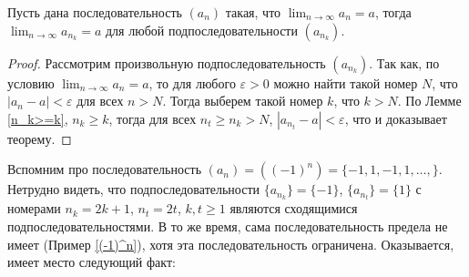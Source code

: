 \begin{theorem}\label{lim(sub)=lim}
    Пусть дана последовательность $(a_n)$ такая, что $\lim_{n\to \infty}a_n = a$, тогда $\lim_{n\to \infty}a_{n_k} =a$ для любой подпоследовательности $(a_{n_k} )$.
\end{theorem}
\begin{proof}
    Рассмотрим произвольную подпоследовательность $(a_{n_k} )$. Так как, по условию $\lim_{n \to \infty}a_n =a$, то для любого $\varepsilon >0$ можно найти такой номер $N$, что $|a_n - a| < \varepsilon$ для всех $n >N$. Тогда выберем такой номер $k$, что $k >N$. По Лемме \ref{n_k>=k}, $n_k \ge k$, тогда для всех $n_t \ge n_k >N$, $|a_{n_t}- a| < \varepsilon$, что и доказывает теорему.
\end{proof}

\begin{example}
 Вспомним про последовательность $(a_n) = ((-1)^n ) = \{-1,1,-1,1, \ldots, \}$. Нетрудно видеть, что подпоследовательности $\{a_{n_k}\} = \{-1\}$, $\{a_{n_t}\} = \{1\}$ с номерами $n_k = 2k+1$, $n_t = 2t$, $k,t \ge 1$ являются сходящимися подпоследовательностями. В то же время, сама последовательность предела не имеет (Пример \ref{(-1)^n}), хотя эта последовательность ограничена. Оказывается, имеет место следующий факт:    
\end{example}


